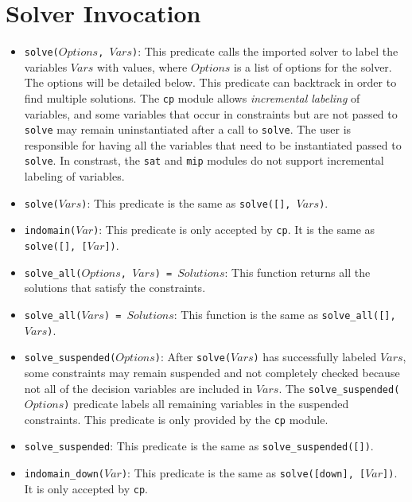 \section{Solver Invocation}
\begin{itemize}
\item \texttt{solve($Options$, $Vars$)}: This predicate calls the imported solver to label the variables $Vars$ with values, where $Options$ is a list of options for the solver. The options will be detailed below. This predicate can backtrack in order to find multiple solutions. The \texttt{cp} module allows \textit{incremental labeling} of variables, and some variables that occur in constraints but are not passed to \texttt{solve} may remain uninstantiated after a call to \texttt{solve}. The user is responsible for having all the variables that need to be instantiated passed to \texttt{solve}. In constrast, the \texttt{sat} and \texttt{mip} modules do not support incremental labeling of variables.

\item\texttt{solve($Vars$)}: This predicate is the same as \texttt{solve([], $Vars$)}. 
\item \texttt{indomain($Var$)}: This predicate is only accepted by \texttt{cp}. It is the same as \texttt{solve([], [$Var$])}.
\item \texttt{solve\_all($Options$, $Vars$) = $Solutions$}: This function returns all the solutions that satisfy the constraints.
\item \texttt{solve\_all($Vars$) = $Solutions$}: This function is the same as \texttt{solve\_all([],$Vars$)}.
\item \texttt{solve\_suspended($Options$)}: After \texttt{solve($Vars$)} has successfully labeled $Vars$, some constraints may remain suspended and not completely checked because not all of the decision variables are included in $Vars$. The \texttt{solve\_suspended($Options$)} predicate labels all remaining variables in the suspended constraints. This predicate is only provided by the \texttt{cp} module. 
\item \texttt{solve\_suspended}: This predicate is the same as \texttt{solve\_suspended([])}.
\item \texttt{indomain\_down($Var$)}: This predicate is the same as \texttt{solve([down], [$Var$])}. It is only accepted by \texttt{cp}. 
\end{itemize}



